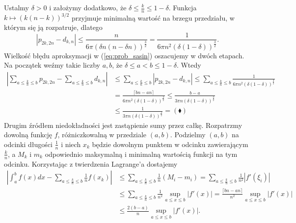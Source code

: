 \documentclass[a4paper,11pt,twoside]{book}
\newcommand{\ceil}[1]{\lceil#1\rceil}
\theoremstyle{definition}
\begin{document}
Ustalmy $\delta > 0$ i założymy dodatkowo, że $\delta \leq \frac{k}{n} \leq 1 - \delta$. Funkcja $k \mapsto \left( k(n-k) \right)^{3/2}$ przyjmuje minimalną wartość na brzegu przedziału, w którym się ją rozpatruje, dlatego
\[ |p_{2k,2n} - d_{k,n}| \leq \frac{n}{6\pi\left( \delta n (n- \delta n) \right)^{\frac{3}{2}}} = \frac{1}{6\pi n^2 \left( \delta(1- \delta) \right)^{\frac{3}{2}}}.  \]
Wielkość błędu aproksymacji w (\ref{eq:prob_sasin}) oszacujemy w dwóch etapach. Na początek weźmy takie liczby $a,b$, że $\delta \leq a < b \leq 1 - \delta$.
Wtedy
\begin{equation*}
 \begin{split}
  \left| \sum_{a \leq \frac{k}{n} \leq b} p_{2k,2n} -  \sum_{a \leq \frac{k}{n} \leq b}  d_{k,n} \right| &\leq \sum_{a \leq \frac{k}{n} \leq b} \left|  p_{2k,2n} -  d_{k,n} \right| \leq \sum_{a \leq \frac{k}{n} \leq b} \frac{1}{6\pi n^2 \left( \delta(1- \delta) \right)^{\frac{3}{2}}} \\
  &= \frac{\ceil{bn - an}}{6\pi n^2 \left( \delta(1- \delta) \right)^{\frac{3}{2}}} \leq \frac{b - a}{3\pi n \left( \delta(1- \delta) \right)^{\frac{3}{2}}} \\
  &\leq \frac{1}{3\pi n \left( \delta(1- \delta) \right)^{\frac{3}{2}}} = (\blacklozenge)
 \end{split}
\end{equation*}
Drugim źródłem niedokładności jest zastąpienie sumy przez całkę. Rozpatrzmy dowolną funkcję $f$, różniczkowalną w przedziale $(a,b)$. Podzielmy $(a,b)$ na odcinki długości $\frac{1}{n}$ i niech $x_k$ będzie dowolnym punktem w odcinku zawierającym $\frac{k}{n}$, a $M_k$ i $m_k$ odpowiednio maksymalną i minimalną wartością funkcji na tym odcinku. Korzystając z twierdzenia Lagrange'a dostajemy
\begin{equation}
 \begin{split}
    \left| \int_a^b f(x) dx - \sum\limits_{a \leq \frac{k}{n} \leq b}\frac{1}{n}f(x_k) \right| &\leq \sum\limits_{a \leq \frac{k}{n} \leq b}\frac{1}{n}(M_i - m_i) = \sum\limits_{a \leq \frac{k}{n} \leq b}\frac{1}{n^2}|f'(\xi_i)| \\
    &\leq \sum\limits_{a \leq \frac{k}{n} \leq b}\frac{1}{n^2} \sup_{a \leq x \leq b} |f'(x)| = \frac{\ceil{bn-an}}{n^2} \sup_{a \leq x \leq b} |f'(x)| \\
    &\leq \frac{2(b-a)}{n} \sup_{a \leq x \leq b} |f'(x)|.
 \end{split}
\end{equation}
\end{document}
